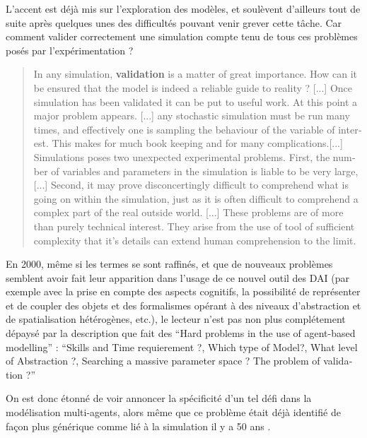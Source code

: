
L'accent est déjà mis sur l'exploration des modèles, et \textcite[301]{Doran1975} soulèvent d'ailleurs tout de suite après quelques unes des difficultés pouvant venir grever cette tâche. Car comment valider correctement une simulation compte tenu de tous ces problèmes posés par l'expérimentation ?

\foreignblockquote{english}[{\cite[301]{Doran1975}}]{In any simulation, \textbf{validation} is a matter of great importance. How can it be ensured that the model is indeed a reliable guide to reality ? [...] Once simulation has been validated it can be put to useful work. At this point a major problem appears. [...] any stochastic simulation must be run many times, and effectively one is sampling the behaviour of the variable of interest. This makes for much book keeping and for many complications.[...] Simulations poses two unexpected experimental problems. First, the number of variables and parameters in the simulation is liable to be very large, [...] Second, it may prove disconcertingly difficult to comprehend what is going on within the simulation, just as it is often difficult to comprehend a complex part of the real outside world. [...] These problems are of more than purely technical interest. They arise from the use of tool of sufficient complexity that it's details can extend human comprehension to the limit.}

En 2000, même si les termes se sont raffinés, et que de nouveaux problèmes semblent avoir fait leur apparition dans l'usage de ce nouvel outil des DAI (par exemple avec la prise en compte des aspects cognitifs, la possibilité de représenter et de coupler des objets et des formalismes opérant à des niveaux d'abstraction et de spatialisation hétérogènes, etc.), le lecteur n'est pas non plus complétement dépaysé par la description que fait \textcite{Doran2000} des \foreignquote{english}{Hard problems in the use of agent-based modelling} : \foreignquote{english}{Skills and Time requierement ?, Which type of Model?, What level of Abstraction ?, Searching a massive parameter space ? The problem of validation ?}

On est donc étonné de voir \textcites[93-94]{Crooks2012}{Crooks2008} annoncer la spécificité d'un tel défi dans la modélisation multi-agents, alors même que ce problème était déjà identifié de façon plus générique comme lié à la simulation il y a 50 ans \autocites{Naylor1967, Hermann1967}.


